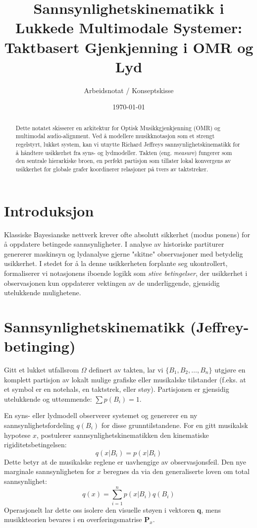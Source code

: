 \documentclass[11pt, a4paper]{article}
\title{Sannsynlighetskinematikk i Lukkede Multimodale Systemer: \\ 
Taktbasert Gjenkjenning i OMR og Lyd}
\author{Arbeidsnotat / Konseptskisse}
\date{\today}
\begin{document}
\maketitle

\begin{abstract}
Dette notatet skisserer en arkitektur for Optisk Musikkgjenkjenning (OMR) og multimodal audio-alignment. Ved å modellere musikknotasjon som et strengt regelstyrt, lukket system, kan vi utnytte Richard Jeffreys sannsynlighetskinematikk for å håndtere usikkerhet fra syns- og lydmodeller. Takten (eng. \textit{measure}) fungerer som den sentrale hierarkiske broen, en perfekt partisjon som tillater lokal konvergens av usikkerhet før globale grafer koordinerer relasjoner på tvers av taktstreker.
\end{abstract}

\section{Introduksjon}
Klassiske Bayesianske nettverk krever ofte absolutt sikkerhet (modus ponens) for å oppdatere betingede sannsynligheter. I analyse av historiske partiturer genererer maskinsyn og lydanalyse gjerne "skitne" observasjoner med betydelig usikkerhet. I stedet for å la denne usikkerheten forplante seg ukontrollert, formaliserer vi notasjonens iboende logikk som \textit{stive betingelser}, der usikkerhet i observasjonen kun oppdaterer vektingen av de underliggende, gjensidig utelukkende mulighetene.

\section{Sannsynlighetskinematikk (Jeffrey-betinging)}
Gitt et lukket utfallsrom $\Omega$ definert av takten, lar vi $\{B_1, B_2, \dots, B_n\}$ utgjøre en komplett partisjon av lokalt mulige grafiske eller musikalske tilstander (f.eks. at et symbol er en notehals, en taktstrek, eller støy). Partisjonen er gjensidig utelukkende og uttømmende: $\sum p(B_i) = 1$.

En syns- eller lydmodell observerer systemet og genererer en ny sannsynlighetsfordeling $q(B_i)$ for disse grunntilstandene. For en gitt musikalsk hypotese $x$, postulerer sannsynlighetskinematikken den kinematiske rigiditetsbetingelsen:
\begin{equation}
    q(x|B_i) = p(x|B_i)
\end{equation}
Dette betyr at de musikalske reglene er uavhengige av observasjonsfeil. Den nye marginale sannsynligheten for $x$ beregnes da via den generaliserte loven om total sannsynlighet:
\begin{equation}
    q(x) = \sum_{i=1}^{n} p(x|B_i)q(B_i)
\end{equation}
Operasjonelt lar dette oss isolere den visuelle støyen i vektoren $\mathbf{q}$, mens musikkteorien bevares i en overføringsmatrise $\mathbf{P}_x$.
\end{document}
